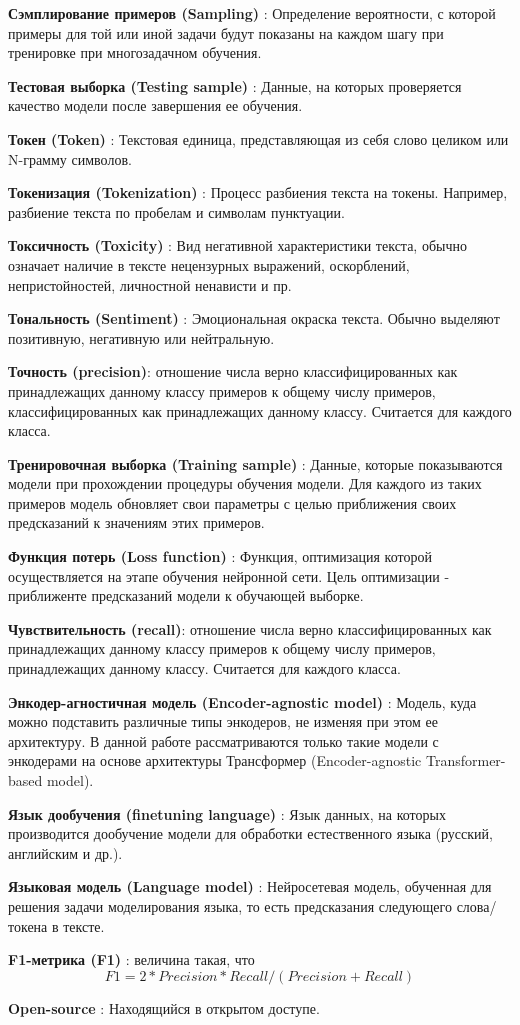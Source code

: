 \textbf{Сэмплирование примеров (Sampling)} : Определение вероятности, с которой примеры  для той или иной задачи будут показаны на каждом шагу при тренировке при многозадачном обучения. 

\textbf{Тестовая выборка (Testing sample)} : Данные, на которых проверяется качество модели после завершения ее обучения.

\textbf{Токен (Token)} : Текстовая единица, представляющая из себя слово целиком или N-грамму символов.

\textbf{Токенизация (Tokenization)} : Процесс разбиения текста на токены. Например, разбиение текста по пробелам и символам пунктуации.

\textbf{Токсичность (Toxicity)} : Вид негативной характеристики текста, обычно означает наличие в тексте нецензурных выражений, оскорблений, непристойностей, личностной ненависти и пр.

\textbf{Тональность (Sentiment)} : Эмоциональная окраска текста. Обычно выделяют позитивную, негативную или нейтральную.

\textbf{Точность (precision)}: отношение числа верно классифицированных как принадлежащих данному классу примеров к общему числу примеров, классифицированных как принадлежащих данному классу. Считается для каждого класса.

\textbf{Тренировочная выборка (Training sample)} : Данные, которые показываются модели при прохождении процедуры обучения модели. Для каждого из таких примеров модель обновляет свои параметры с целью приближения своих предсказаний к значениям этих примеров.

\textbf{Функция потерь (Loss function)} : Функция, оптимизация которой осуществляется на этапе обучения нейронной сети. Цель оптимизации - приближенте предсказаний модели к обучающей выборке.

\textbf{Чувствительность (recall)}: отношение числа верно классифицированных как принадлежащих данному классу примеров к общему числу примеров, принадлежащих данному классу. Считается для каждого класса.

\textbf{Энкодер-агностичная модель (Encoder-agnostic model)} : Модель, куда можно подставить различные типы энкодеров, не  изменяя при этом ее архитектуру. В данной работе рассматриваются только такие модели с энкодерами на основе архитектуры Трансформер (Encoder-agnostic Transformer-based model).

\textbf{Язык дообучения (finetuning language)} : Язык данных, на которых производится дообучение модели для обработки естественного языка (русский, английским и др.).

\textbf{Языковая модель (Language model)} : Нейросетевая модель, обученная для решения задачи моделирования языка, то есть предсказания следующего слова/токена в тексте.

\textbf{F1-метрика (F1)} : величина такая, что \begin{equation}
F1 = 2*Precision*Recall/(Precision+Recall)
\end{equation}

\textbf{Open-source} : Находящийся в открытом доступе.

